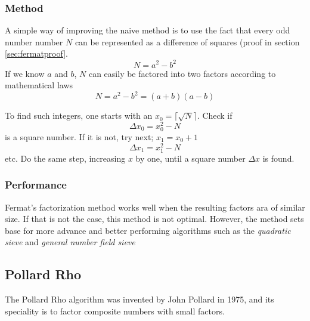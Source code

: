 \documentclass[a4paper, 12pt]{report}
\begin{document}
\subsubsection{Method}
A simple way of improving the naive method is to use the fact that every odd number number $N$ can be represented as a difference of squares (proof in section \ref{sec:fermatproof}.
\begin{equation}
N = a^2 - b^2
\end{equation}
If we know $a$ and $b$, $N$ can easily be factored into two factors according to mathematical laws
\begin{equation}
N = a^2 - b^2 = (a + b)(a - b)
\end{equation}

To find such integers, one starts with an $x_0 = \lceil \sqrt{N} \rceil $. Check if 
\begin{equation}
\Delta x_0 = x_0^2 - N
\end{equation}
is a square number. If it is not, try next; $x_1 = x_0 + 1$
\begin{equation}
\Delta x_1 = x_1^2 - N
\end{equation}
etc. Do the same step, increasing $x$ by one, until a square number $ \Delta x $ is found.

\subsubsection{Performance}
Fermat's factorization method works well when the resulting factors ara of similar size. If that is not the case, this method is not optimal. However, the method sets base for more advance and better performing algorithms such as the \emph{quadratic sieve} and \emph{general number field sieve}

\subsection{Pollard Rho}
The Pollard Rho algorithm was invented by John Pollard in 1975, and its speciality is to factor composite numbers with small factors.
\end{document}
